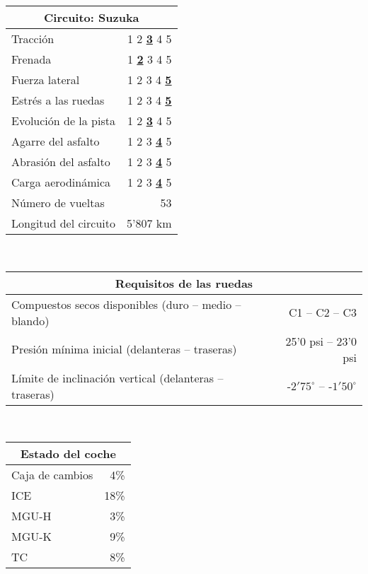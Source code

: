 \documentclass[12pt,a4paper,twoside,spanish]{article}      %
\begin{document}
\begin{table}[H]
    \centering
    \begin{tabular}{lr}
        \toprule
        \multicolumn{2}{c}{Circuito: \textbf{Suzuka}} \\ \midrule
        Tracción & 1 2 \underline{\textbf{3}} 4 5 \\
        Frenada & 1 \underline{\textbf{2}} 3 4 5 \\
        Fuerza lateral & 1 2 3 4 \underline{\textbf{5}} \\
        Estrés a las ruedas & 1 2 3 4 \underline{\textbf{5}} \\
        Evolución de la pista & 1 2 \underline{\textbf{3}} 4 5 \\
        Agarre del asfalto & 1 2 3 \underline{\textbf{4}} 5 \\
        Abrasión del asfalto & 1 2 3 \underline{\textbf{4}} 5 \\
        Carga aerodinámica & 1 2 3 \underline{\textbf{4}} 5 \\
        Número de vueltas & 53 \\
        Longitud del circuito & 5'807 km \\ \bottomrule
    \end{tabular} \\ \vspace{1em}
    \begin{tabular}{lr}
        \toprule
        \multicolumn{2}{c}{\textbf{Requisitos de las ruedas}} \\ \midrule
        Compuestos secos disponibles (duro -- medio -- blando) & C1 -- C2 -- C3 \\
        Presión mínima inicial (delanteras -- traseras) & 25'0 psi -- 23'0 psi \\
        Límite de inclinación vertical (delanteras -- traseras) & -$2'75^\circ$ -- -$1'50^\circ$ \\ \bottomrule
    \end{tabular} \\ \vspace{1em}
    \begin{tabular}{lr}
        \toprule
        \multicolumn{2}{c}{\textbf{Estado del coche}} \\ \midrule
        Caja de cambios & 4\% \\
        ICE & 18\% \\
        MGU-H & 3\% \\
        MGU-K & 9\% \\
        TC & 8\% \\

\end{tabular}
\end{table}
\end{document}
